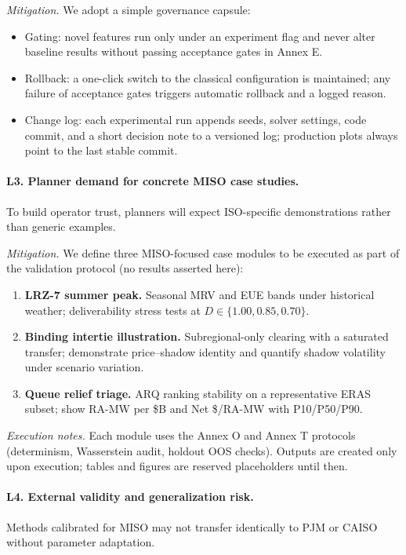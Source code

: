 \documentclass[11pt]{article}
\numberwithin{equation}{section}
\theoremstyle{definition}
\theoremstyle{remark}
\begin{document}
\emph{Mitigation.} We adopt a simple governance capsule:
\begin{itemize}[leftmargin=1.2em]
  \item Gating: novel features run only under an experiment flag and never alter baseline results without passing acceptance gates in Annex E.
  \item Rollback: a one-click switch to the classical configuration is maintained; any failure of acceptance gates triggers automatic rollback and a logged reason.
  \item Change log: each experimental run appends seeds, solver settings, code commit, and a short decision note to a versioned log; production plots always point to the last stable commit.
\end{itemize}

\paragraph{L3. Planner demand for concrete MISO case studies.}
To build operator trust, planners will expect ISO-specific demonstrations rather than generic examples.

\emph{Mitigation.} We define three MISO-focused case modules to be executed as part of the validation protocol (no results asserted here):
\begin{enumerate}[leftmargin=1.2em]
  \item \textbf{LRZ-7 summer peak.} Seasonal MRV and EUE bands under historical weather; deliverability stress tests at $D\in\{1.00,0.85,0.70\}$.
  \item \textbf{Binding intertie illustration.} Subregional-only clearing with a saturated transfer; demonstrate price–shadow identity and quantify shadow volatility under scenario variation.
  \item \textbf{Queue relief triage.} ARQ ranking stability on a representative ERAS subset; show RA-MW per \$B and Net \$/RA-MW with P10/P50/P90.
\end{enumerate}
\emph{Execution notes.} Each module uses the Annex O and Annex T protocols (determinism, Wasserstein audit, holdout OOS checks). Outputs are created only upon execution; tables and figures are reserved placeholders until then.

\paragraph{L4. External validity and generalization risk.}
Methods calibrated for MISO may not transfer identically to PJM or CAISO without parameter adaptation.
\end{document}
